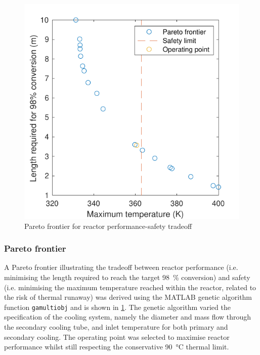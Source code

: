 \begin{figure}[h]
\begin{minipage}[t]{0.45\linewidth}
        \includegraphics[width=\linewidth]{figures/comsol-pareto.pdf}
        \caption{Pareto frontier for reactor performance-safety tradeoff}
        \label{fig:comsol-pareto}
    \end{minipage}\hfill
\end{figure}

\subsubsection{Pareto frontier}
A Pareto frontier illustrating the tradeoff between reactor performance (i.e. minimising the length required to reach the target \SI{98}{\percent} conversion) and safety (i.e. minimising the maximum temperature reached within the reactor, related to the risk of thermal runaway) was derived using the MATLAB genetic algorithm function \texttt{gamultiobj} and is shown in \cref{fig:comsol-pareto}. The genetic algorithm varied the specification of the cooling system, namely the diameter and mass flow through the secondary cooling tube, and inlet temperature for both primary and secondary cooling. The operating point was selected to maximise reactor performance whilst still respecting the conservative \SI{90}{\celsius} thermal limit.

